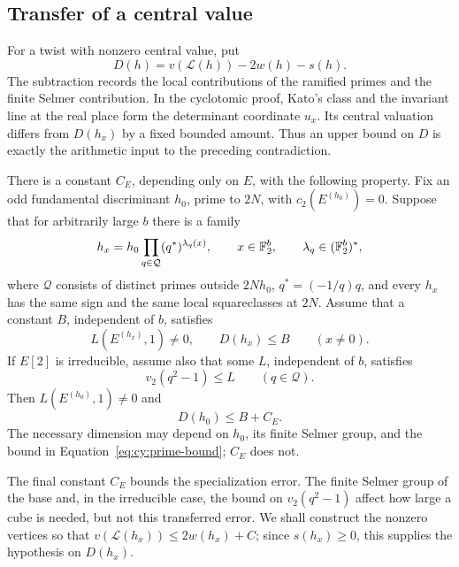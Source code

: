 \subsection{Transfer of a central value}

For a twist with nonzero central value, put
\begin{equation}\label{eq:transfer-normalized-value}
                  D(h)=v(\mathcal L(h))-2w(h)-s(h).
\end{equation}
The subtraction records the local contributions of the ramified primes
and the finite Selmer contribution. In the cyclotomic proof, Kato's class
and the invariant line at the real place form the determinant coordinate
$u_x$. Its central valuation differs from $D(h_x)$ by a fixed bounded
amount. Thus an upper bound on $D$ is exactly the arithmetic input to
the preceding contradiction.

\begin{theorem}
\label{thm:cyclotomic-interpolation}
There is a constant $C_E$, depending only on $E$, with the following
property. Fix an odd fundamental discriminant $h_0$, prime to $2N$, with
$c_2(E^{(h_0)})=0$. Suppose that for arbitrarily
large $b$ there is a family
\begin{equation}\label{eq:cy:cube}
 h_x=h_0\prod_{q\in\mathcal Q}(q^*)^{\lambda_q(x)},
 \qquad x\in\mathbb F_2^b,\qquad \lambda_q\in(\mathbb F_2^b)^*,
\end{equation}
where $\mathcal Q$ consists of distinct primes outside $2Nh_0$,
$q^*=(-1/q)q$, and every $h_x$ has the same sign and the same local
squareclasses at $2N$. Assume that a constant $B$, independent of $b$,
satisfies
\begin{equation}\label{eq:cy:punctured-bound}
 L(E^{(h_x)},1)\ne0,\qquad D(h_x)\le B\qquad(x\ne0).
\end{equation}
If $E[2]$ is irreducible, assume also that some $L$, independent of $b$,
satisfies
\begin{equation}\label{eq:cy:prime-bound}
 v_2(q^2-1)\le L\qquad(q\in\mathcal Q).
\end{equation}
Then $L(E^{(h_0)},1)\ne0$ and
\begin{equation}\label{eq:cy:transferred-bound}
 D(h_0)\le B+C_E.
\end{equation}
The necessary dimension may depend on $h_0$, its finite Selmer group,
and the bound in Equation~\eqref{eq:cy:prime-bound}; $C_E$ does not.
\end{theorem}

The final constant $C_E$ bounds the specialization error. The finite
Selmer group of the base and, in the irreducible case, the bound on
$v_2(q^2-1)$ affect how large a cube is needed, but not this transferred
error. We shall construct the nonzero vertices so that
$v(\mathcal L(h_x))\le2w(h_x)+C$; since $s(h_x)\ge0$, this supplies
the hypothesis on $D(h_x)$.

